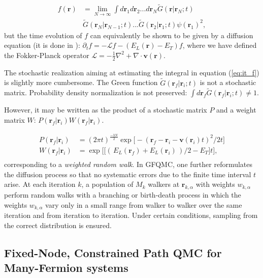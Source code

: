 \documentclass[10pt, twocolumn, twoside]{article}
\begin{document}
\begin{equation}\label{eq:it_f}
\begin{split}
f(\bm r) &= \lim_{N\rightarrow \infty} \int d\bm r_1 d\bm r_2 ... d\bm r_N \tilde{G}(\bm r| \bm r_N ;t) \\
&\tilde{G}(\bm r_N| \bm r_{N-1} ;t) ... \tilde{G}(\bm r_2| \bm r_1 ;t) \psi(\bm r_1)^2 ,
\end{split}
\end{equation}
but the time evolution of $f$ can equivalently be shown to be given by a diffusion equation (it is done in \cite{vmc_review}): $\partial_t f = -\mathcal{L}f - (E_L (\bm r) - E_T)f$, 
where we have defined the Fokker-Planck operator $\mathcal{L} = -\frac{1}{2}\nabla^2 + \nabla \cdot \bm v(\bm r)$.\par

The stochastic realization aiming at estimating the integral in equation (\ref{eq:it_f}) is slightly more cumbersome. The Green function $\tilde{G}(\bm r_f| \bm r_i ;t)$ is not a stochastic matrix. Probability density normalization is not preserved: $\int d\bm r_f \tilde{G} ( \bm r_f | \bm r_i ; t) \neq 1$.

However, it may be written as the product of a stochastic matrix $P$ and a weight matrix $W$: $P(\bm r_f | \bm r_i) W ( \bm r_f | \bm r_i )$.

\begin{equation}
\begin{split}
P(\bm r_f | \bm r_i) &= (2\pi t)^{\frac{-3N}{2}} \exp{\bigg[-(\bm r_f -\bm r_i - \bm v(\bm r_i)t )^2 / 2t \bigg]} \\
W ( \bm r_f | \bm r_i ) &= \exp{\bigg[ \big[ (\, E_L (\bm r_f) + E_L (\bm r_i) \, )/2 - E_T \big] t \bigg]} , \\
\end{split}
\end{equation}
corresponding to a \emph{weighted random walk}. In GFQMC, one further reformulates the diffusion process so that no systematic errors due to the finite time interval $t$ arise. At each iteration $k$, a population of $M_k$ walkers at $\bm r_{k, \alpha}$ with weights $w_{k, \alpha}$ perform random walks with a branching or birth-death process in which the weights $w_{k, \alpha}$ vary only in a small range from walker to walker over the same iteration and from iteration to iteration. Under certain conditions, sampling from the correct distribution is ensured.

\subsection{Fixed-Node, Constrained Path QMC for Many-Fermion systems}
\end{document}
